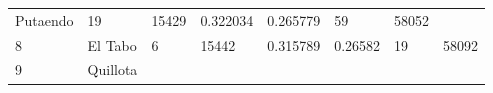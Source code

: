 \documentclass[]{article}
\begin{document}
\begin{longtable}[]{@{}llllllll@{}}
\begin{minipage}[t]{0.09\columnwidth}
Putaendo\strut
\end{minipage} & \begin{minipage}[t]{0.14\columnwidth}\raggedright
19\strut
\end{minipage} & \begin{minipage}[t]{0.13\columnwidth}\raggedright
15429\strut
\end{minipage} & \begin{minipage}[t]{0.10\columnwidth}\raggedright
0.322034\strut
\end{minipage} & \begin{minipage}[t]{0.09\columnwidth}\raggedright
0.265779\strut
\end{minipage} & \begin{minipage}[t]{0.10\columnwidth}\raggedright
59\strut
\end{minipage} & \begin{minipage}[t]{0.10\columnwidth}\raggedright
58052\strut
\end{minipage}\tabularnewline
\begin{minipage}[t]{0.03\columnwidth}\raggedright
8\strut
\end{minipage} & \begin{minipage}[t]{0.09\columnwidth}\raggedright
El Tabo\strut
\end{minipage} & \begin{minipage}[t]{0.14\columnwidth}\raggedright
6\strut
\end{minipage} & \begin{minipage}[t]{0.13\columnwidth}\raggedright
15442\strut
\end{minipage} & \begin{minipage}[t]{0.10\columnwidth}\raggedright
0.315789\strut
\end{minipage} & \begin{minipage}[t]{0.09\columnwidth}\raggedright
0.26582\strut
\end{minipage} & \begin{minipage}[t]{0.10\columnwidth}\raggedright
19\strut
\end{minipage} & \begin{minipage}[t]{0.10\columnwidth}\raggedright
58092\strut
\end{minipage}\tabularnewline
\begin{minipage}[t]{0.03\columnwidth}\raggedright
9\strut
\end{minipage} & \begin{minipage}[t]{0.09\columnwidth}\raggedright
Quillota\strut
\end{minipage} & \begin{minipage}[t]{0.14\columnwidth}\raggedright

\end{minipage}
\end{longtable}
\end{document}
